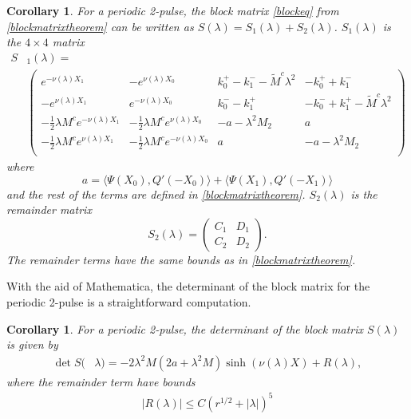 \documentclass[11pt,reqno]{amsart}
\theoremstyle{plain}
\newtheorem{corollary}[theorem]{Corollary}
\theoremstyle{definition}
\theoremstyle{remark}
\begin{document}
\begin{corollary}\label{corr:2blockmatrix}
For a periodic 2-pulse, the block matrix \cref{blockeq} from \cref{blockmatrixtheorem} can be written as $S(\lambda) = S_1(\lambda) + S_2(\lambda)$. $S_1(\lambda)$ is the $4 \times 4$ matrix
\begin{align}
S&_1(\lambda) = \\
&\begin{pmatrix}
e^{-\nu(\lambda)X_1} & -e^{\nu(\lambda)X_0} & k_0^+ - k_1^- -\tilde{M}^c \lambda^2 & -k_0^+ + k_1^- \\
-e^{\nu(\lambda)X_1} & e^{-\nu(\lambda)X_0} & k_0^- - k_1^+ & -k_0^- + k_1^+-\tilde{M}^c \lambda^2 \\
-\frac{1}{2}\lambda M^c e^{-\nu(\lambda)X_1} & -\frac{1}{2}\lambda M^ce^{\nu(\lambda)X_0} &-a-\lambda^2 M_2 & a \\
-\frac{1}{2}\lambda M^c e^{\nu(\lambda)X_1} & -\frac{1}{2}\lambda M^c e^{-\nu(\lambda)X_0}  & a & -a-\lambda^2 M_2 \\
\end{pmatrix}
\end{align}
where
\begin{equation}\label{2pa}
a = \langle \Psi(X_0), Q'(-X_0) \rangle + \langle \Psi(X_1), Q'(-X_1) \rangle
\end{equation}
and the rest of the terms are defined in \cref{blockmatrixtheorem}. $S_2(\lambda)$ is the remainder matrix
\[
S_2(\lambda) = \begin{pmatrix} C_1 & D_1 \\ C_2 & D_2 \end{pmatrix}.
\]
The remainder terms have the same bounds as in \cref{blockmatrixtheorem}.
\end{corollary}

With the aid of Mathematica, the determinant of the block matrix for the periodic 2-pulse is a straightforward computation.

\begin{corollary}\label{corr:2perDet1}
For a periodic 2-pulse, the determinant of the block matrix $S(\lambda)$ is given by
\begin{equation*}
\begin{aligned}
\det S(&\lambda) = -2 \lambda^2 M (2a + \lambda^2 M) \sinh(\nu(\lambda)X) + R(\lambda),
\end{aligned}
\end{equation*}
where the remainder term have bounds
\begin{align*}
|R(\lambda)| \leq C(r^{1/2} + |\lambda|)^5
\end{align*}
\end{corollary}
\end{document}
